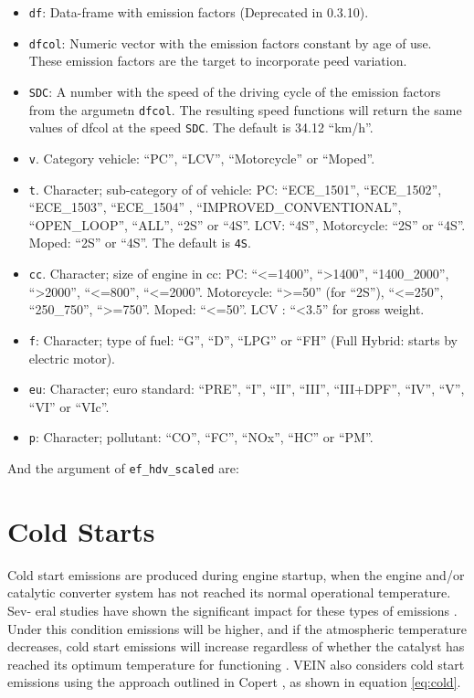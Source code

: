 \documentclass[12pt,graybox,envcountchap,sectrefs]{krantz}
\providecommand{\tightlist}{%
  \setlength{\itemsep}{0pt}\setlength{\parskip}{0pt}}
\theoremstyle{definition}
\theoremstyle{definition}
\theoremstyle{definition}
\theoremstyle{remark}
\begin{document}
\begin{itemize}
\tightlist
\item
  \texttt{df}: Data-frame with emission factors (Deprecated in 0.3.10).
\item
  \texttt{dfcol}: Numeric vector with the emission factors constant by
  age of use. These emission factors are the target to incorporate peed
  variation.
\item
  \texttt{SDC}: A number with the speed of the driving cycle of the
  emission factors from the argumetn \texttt{dfcol}. The resulting speed
  functions will return the same values of dfcol at the speed
  \texttt{SDC}. The default is 34.12 ``km/h''.
\item
  \texttt{v}. Category vehicle: ``PC'', ``LCV'', ``Motorcycle'' or
  ``Moped''.
\item
  \texttt{t}. Character; sub-category of of vehicle: PC: ``ECE\_1501'',
  ``ECE\_1502'', ``ECE\_1503'', ``ECE\_1504'' ,
  ``IMPROVED\_CONVENTIONAL'', ``OPEN\_LOOP'', ``ALL'', ``2S'' or ``4S''.
  LCV: ``4S'', Motorcycle: ``2S'' or ``4S''. Moped: ``2S'' or ``4S''.
  The default is \texttt{4S}.
\item
  \texttt{cc}. Character; size of engine in cc: PC:
  ``\textless{}=1400'', ``\textgreater{}1400'', ``1400\_2000'',
  ``\textgreater{}2000'', ``\textless{}=800'', ``\textless{}=2000''.
  Motorcycle: ``\textgreater{}=50'' (for ``2S''), ``\textless{}=250'',
  ``250\_750'', ``\textgreater{}=750''. Moped: ``\textless{}=50''. LCV :
  ``\textless{}3.5'' for gross weight.
\item
  \texttt{f}: Character; type of fuel: ``G'', ``D'', ``LPG'' or ``FH''
  (Full Hybrid: starts by electric motor).
\item
  \texttt{eu}: Character; euro standard: ``PRE'', ``I'', ``II'',
  ``III'', ``III+DPF'', ``IV'', ``V'', ``VI'' or ``VIc''.
\item
  \texttt{p}: Character; pollutant: ``CO'', ``FC'', ``NOx'', ``HC'' or
  ``PM''.
\end{itemize}

And the argument of \texttt{ef\_hdv\_scaled} are:

\section{Cold Starts}\label{cold-starts}

Cold start emissions are produced during engine startup, when the engine
and/or catalytic converter system has not reached its normal operational
temperature. Sev- eral studies have shown the significant impact for
these types of emissions
\citep[\citet{Weilenmannetal2009}]{chenetal2011}. Under this condition
emissions will be higher, and if the atmospheric temperature decreases,
cold start emissions will increase regardless of whether the catalyst
has reached its optimum temperature for functioning \citep{artemis}.
VEIN also considers cold start emissions using the approach outlined in
Copert \citep{NtziachristosSamaras2016}, as shown in equation
\eqref{eq:cold}.
\end{document}
